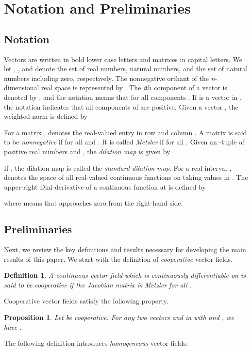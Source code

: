 \documentclass[11pt,draftclsnofoot,onecolumn]{IEEEtran}
\newtheorem{definition}{\normalfont \bfseries Definition}
\newtheorem{proposition}{\normalfont \bfseries Proposition}
\begin{document}
\section{Notation and Preliminaries}\label{sec:preliminaries}

\subsection{Notation}

Vectors are written in bold lower case letters and matrices in capital letters. We let , , and  denote the set of real numbers, natural numbers, and the set of natural numbers including zero, respectively. The nonnegative orthant of the {\em n}-dimensional real space  is represented by . The {\em i}th component of a vector  is denoted by , and the notation  means that  for all components . If  is a vector in , the notation  indicates that all components of  are positive. Given a vector , the weighted  norm is defined by

For a matrix ,  denotes the real-valued entry in row  and column . A matrix  is said to be {\em nonnegative} if  for all  and . It is called {\em Metzler} if  for all . Given an -tuple  of positive real numbers and ,  the {\em dilation map}  is given by

If , the dilation map is called the {\em standard dilation map}. For a real interval ,  denotes the space of all real-valued continuous functions on  taking values in . The upper-right Dini-derivative of a continuous function  at  is defined by

where  means that  approaches zero from the right-hand side.

\subsection{Preliminaries}

Next, we review the key definitions and results necessary for developing the main results of this paper. We start with the definition of {\em cooperative} vector fields.

\begin{definition}
A continuous vector field  which is continuously differentiable on  is said to be cooperative if the Jacobian matrix  is Metzler for all .
\end{definition}
Cooperative vector fields satisfy the following property.

\begin{proposition}\textup{\textbf{\cite[Remark 3.1.1]{Smith:95}}}
\label{Proposition 0}
Let  be cooperative. For any two vectors  and  in  with  and , we have .
\end{proposition}
The following definition introduces {\em homogeneous} vector fields.
\end{document}
